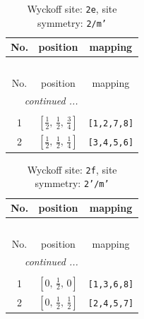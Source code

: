 \documentclass[fleqn,8pt]{jsarticle}
\begin{document}
\begin{longtable}{ccc}
\caption{Wyckoff site: {\tt 2e}, site symmetry: {\tt 2/m'}}
 \\
 \hline \hline
No. & position & mapping \\ \hline \endfirsthead

\multicolumn{2}{l}{\tablename\ \thetable{}} \\
 \hline \hline
No. & position & mapping \\ \hline \endhead

 \hline \hline
\multicolumn{2}{r}{\footnotesize\it continued ...} \\ \endfoot

 \hline \hline
\multicolumn{2}{r}{} \\ \endlastfoot

1 & $\left[ \frac{1}{2},\, \frac{1}{2},\, \frac{3}{4} \right]$ & {\tt [1,2,7,8]} \\ \hline
2 & $\left[ \frac{1}{2},\, \frac{1}{2},\, \frac{1}{4} \right]$ & {\tt [3,4,5,6]} \\
\end{longtable}
\renewcommand{\arraystretch}{1.2}
\begin{longtable}{ccc}
\caption{Wyckoff site: {\tt 2f}, site symmetry: {\tt 2'/m'}}
 \\
 \hline \hline
No. & position & mapping \\ \hline \endfirsthead

\multicolumn{2}{l}{\tablename\ \thetable{}} \\
 \hline \hline
No. & position & mapping \\ \hline \endhead

 \hline \hline
\multicolumn{2}{r}{\footnotesize\it continued ...} \\ \endfoot

 \hline \hline
\multicolumn{2}{r}{} \\ \endlastfoot

1 & $\left[ 0,\, \frac{1}{2},\, 0 \right]$ & {\tt [1,3,6,8]} \\ \hline
2 & $\left[ 0,\, \frac{1}{2},\, \frac{1}{2} \right]$ & {\tt [2,4,5,7]} \\
\end{longtable}
\renewcommand{\arraystretch}{1.2}
\end{document}
